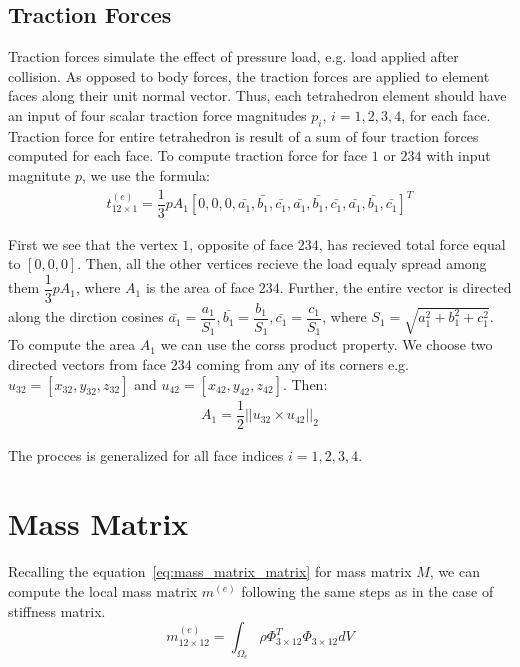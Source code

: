 \documentclass[en]{minipw} %
\begin{document}
\subsection{Traction Forces}
Traction forces simulate the effect of pressure load, e.g. load applied after collision. As opposed to body forces, the traction forces are applied to element faces along their unit normal vector. Thus, each tetrahedron element should have an input of four scalar traction force magnitudes $p_i$, $i=1,2,3,4$, for each face. Traction force for entire tetrahedron is result of a sum of four traction forces computed for each face. To compute traction force for face $1$ or $234$ with input magnitute $p$, we use the formula:
\begin{equation}
\begin{aligned}
t^{(e)}_{12 \times 1} = \dfrac{1}{3} p A_1 [0, 0, 0, \bar{a_1}, \bar{b_1}, \bar{c_1}, \bar{a_1}, \bar{b_1}, \bar{c_1},\bar{a_1}, \bar{b_1}, \bar{c_1}]^{T} 
\end{aligned}
\end{equation}

First we see that the vertex $1$, opposite of face $234$, has recieved total force equal to $[0,0,0]$. Then, all the other vertices recieve the load equaly spread among them $\dfrac{1}{3}p A_1$, where $A_1$ is the area of face $234$. Further, the entire vector is directed along the dirction cosines $\bar{a_1} = \dfrac{a_1}{S_1}, \bar{b_1} = \dfrac{b_1}{S_1}, \bar{c_1} = \dfrac{c_1}{S_1}$, where $S_1 = \sqrt{a^{2}_{1} + b^{2}_{1} + c^{2}_{1}}$. To compute the area $A_1$ we can use the corss product property. We choose two directed vectors from face $234$ coming from any of its corners e.g. $u_{32} = [x_{32}, y_{32}, z_{32}]$ and $u_{42} = [x_{42}, y_{42}, z_{42}]$. Then:
\begin{equation}
\begin{aligned}
A_1 = \dfrac{1}{2} ||u_{32} \times u_{42}||_{2}
\end{aligned}
\end{equation}

The procces is generalized for all face indices $i = 1,2,3,4$.

\section{Mass Matrix}
Recalling the equation~\ref{eq:mass_matrix_matrix} for mass matrix $M$, we can compute the local mass matrix $m^{(e)}$ following the same steps as in the case of stiffness matrix.
\begin{equation}
m^{(e)}_{12 \times 12} =  \int_{\Omega_{e}} \rho \Phi^{T}_{3 \times 12} \Phi_{3 \times 12} dV
\end{equation}
\end{document}
